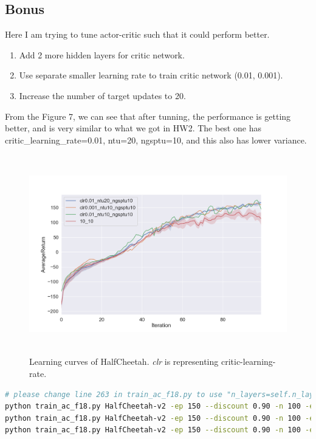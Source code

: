 \documentclass[12pt]{article}
\begin{document}
\newpage
\subsection*{Bonus}
Here I am trying to tune actor-critic such that it could perform better.
\begin{enumerate}
\item Add 2 more hidden layers for critic network.
\item Use separate smaller learning rate to train critic network (0.01, 0.001).
\item Increase the number of target updates to 20.
\end{enumerate}
From the Figure 7, we can see that after tunning, the performance is getting better, and is very similar to what we got in HW2. The best one has critic\_learning\_rate=0.01, ntu=20, ngsptu=10, and this also has lower variance.
\begin{figure}[H]
  \centering
  \includegraphics[height=3.4in]{bonus.png}
  \caption{Learning curves of HalfCheetah. \textit{clr} is representing critic-learning-rate.}
\end{figure}
\begin{lstlisting}[language=bash]
# please change line 263 in train_ac_f18.py to use "n_layers=self.n_layers + 2" before running
python train_ac_f18.py HalfCheetah-v2 -ep 150 --discount 0.90 -n 100 -e 3 -l 2 -s 32 -b 30000 -lr 0.02 -clr 0.01 --exp_name clr0.01_ntu10_ngsptu10 -ntu 10 -ngsptu 10
python train_ac_f18.py HalfCheetah-v2 -ep 150 --discount 0.90 -n 100 -e 3 -l 2 -s 32 -b 30000 -lr 0.02 -clr 0.001 --exp_name clr0.001_ntu10_ngsptu10 -ntu 10 -ngsptu 10
python train_ac_f18.py HalfCheetah-v2 -ep 150 --discount 0.90 -n 100 -e 3 -l 2 -s 32 -b 30000 -lr 0.02 -clr 0.01 --exp_name clr0.01_ntu20_ngsptu10 -ntu 20 -ngsptu 10
\end{lstlisting}
\end{document}
